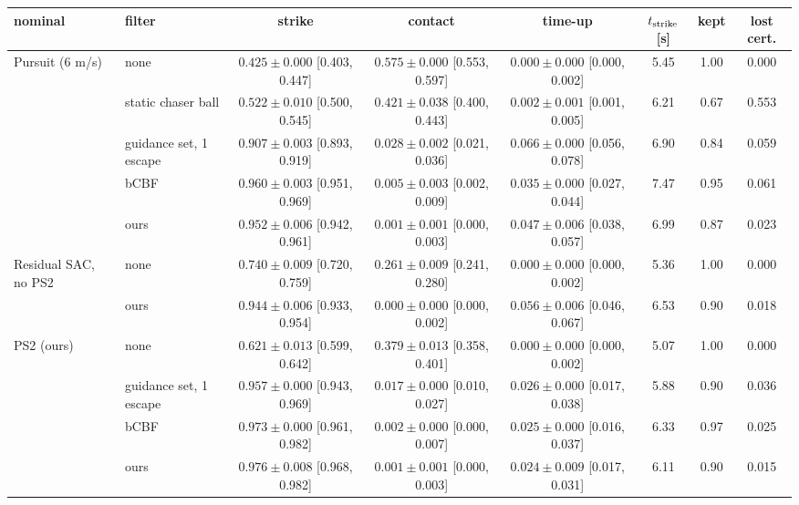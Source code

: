 \begin{tabular}{llcccccc}\toprule
nominal & filter & strike & contact & time-up & $t_{\rm strike}$ [s] & kept & lost cert.\\\midrule
Pursuit (6 m/s) & none & $0.425\pm0.000$ {\scriptsize [0.403, 0.447]} & $0.575\pm0.000$ {\scriptsize [0.553, 0.597]} & $0.000\pm0.000$ {\scriptsize [0.000, 0.002]} & 5.45 & 1.00 & 0.000\\
 & static chaser ball & $0.522\pm0.010$ {\scriptsize [0.500, 0.545]} & $0.421\pm0.038$ {\scriptsize [0.400, 0.443]} & $0.002\pm0.001$ {\scriptsize [0.001, 0.005]} & 6.21 & 0.67 & 0.553\\
 & guidance set, 1 escape & $0.907\pm0.003$ {\scriptsize [0.893, 0.919]} & $0.028\pm0.002$ {\scriptsize [0.021, 0.036]} & $0.066\pm0.000$ {\scriptsize [0.056, 0.078]} & 6.90 & 0.84 & 0.059\\
 & bCBF & $0.960\pm0.003$ {\scriptsize [0.951, 0.969]} & $0.005\pm0.003$ {\scriptsize [0.002, 0.009]} & $0.035\pm0.000$ {\scriptsize [0.027, 0.044]} & 7.47 & 0.95 & 0.061\\
 & ours & $0.952\pm0.006$ {\scriptsize [0.942, 0.961]} & $0.001\pm0.001$ {\scriptsize [0.000, 0.003]} & $0.047\pm0.006$ {\scriptsize [0.038, 0.057]} & 6.99 & 0.87 & 0.023\\
\midrule
Residual SAC, no PS2 & none & $0.740\pm0.009$ {\scriptsize [0.720, 0.759]} & $0.261\pm0.009$ {\scriptsize [0.241, 0.280]} & $0.000\pm0.000$ {\scriptsize [0.000, 0.002]} & 5.36 & 1.00 & 0.000\\
 & ours & $0.944\pm0.006$ {\scriptsize [0.933, 0.954]} & $0.000\pm0.000$ {\scriptsize [0.000, 0.002]} & $0.056\pm0.006$ {\scriptsize [0.046, 0.067]} & 6.53 & 0.90 & 0.018\\
\midrule
PS2 (ours) & none & $0.621\pm0.013$ {\scriptsize [0.599, 0.642]} & $0.379\pm0.013$ {\scriptsize [0.358, 0.401]} & $0.000\pm0.000$ {\scriptsize [0.000, 0.002]} & 5.07 & 1.00 & 0.000\\
 & guidance set, 1 escape & $0.957\pm0.000$ {\scriptsize [0.943, 0.969]} & $0.017\pm0.000$ {\scriptsize [0.010, 0.027]} & $0.026\pm0.000$ {\scriptsize [0.017, 0.038]} & 5.88 & 0.90 & 0.036\\
 & bCBF & $0.973\pm0.000$ {\scriptsize [0.961, 0.982]} & $0.002\pm0.000$ {\scriptsize [0.000, 0.007]} & $0.025\pm0.000$ {\scriptsize [0.016, 0.037]} & 6.33 & 0.97 & 0.025\\
 & ours & $0.976\pm0.008$ {\scriptsize [0.968, 0.982]} & $0.001\pm0.001$ {\scriptsize [0.000, 0.003]} & $0.024\pm0.009$ {\scriptsize [0.017, 0.031]} & 6.11 & 0.90 & 0.015\\
\bottomrule\end{tabular}
